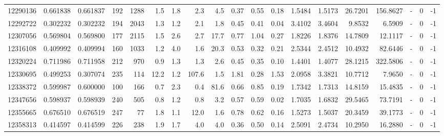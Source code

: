 \begin{tabular}{rrrrrrrrrrrrrrrrlrr}
  12290136 & 0.661838 &   0.661837 &  192 & 1288 &      1.5 &      1.8 &     2.3 &      4.5 &       0.37 &        0.55 &        0.18 &  1.5484 &  1.5173 &   26.7201 &  156.8627 &             - &        0 &         -1 \\
  12292722 & 0.302232 &   0.302232 &  194 & 2043 &      1.3 &      1.2 &     2.1 &      1.8 &       0.45 &        0.41 &        0.04 &  3.4102 &  3.4604 &    9.8532 &    6.5909 &             - &        0 &         -1 \\
  12307056 & 0.569804 &   0.569800 &  177 & 2115 &      1.5 &      2.6 &     2.7 &     17.7 &       0.77 &        1.04 &        0.27 &  1.8226 &  1.8376 &   14.7809 &   12.1117 &             - &        0 &         -1 \\
  12316108 & 0.409992 &   0.409994 &  160 & 1033 &      1.2 &      4.0 &     1.6 &     20.3 &       0.53 &        0.32 &        0.21 &  2.5344 &  2.4512 &   10.4932 &   82.6446 &             - &        0 &         -1 \\
  12320224 & 0.711986 &   0.711958 &  212 &  970 &      0.9 &      1.3 &     1.3 &      2.6 &       0.45 &        0.35 &        0.10 &  1.4401 &  1.4077 &   28.1215 &  322.5806 &             - &        0 &         -1 \\
  12330695 & 0.499253 &   0.307074 &  235 &  114 &     12.2 &      1.2 &   107.6 &      1.5 &       1.81 &        0.28 &        1.53 &  2.0958 &  3.3821 &   10.7712 &    7.9650 &             - &        0 &         -1 \\
  12338372 & 0.599987 &   0.600000 &  100 &  166 &      0.7 &      2.3 &     0.4 &     81.6 &       0.66 &        0.85 &        0.19 &  1.7342 &  1.7313 &   14.8159 &   15.4835 &             - &        0 &         -1 \\
  12347656 & 0.598937 &   0.598939 &  240 &  505 &      0.8 &      1.2 &     0.8 &      3.2 &       0.57 &        0.59 &        0.02 &  1.7035 &  1.6832 &   29.5465 &   73.7191 &             - &        0 &         -1 \\
  12355665 & 0.676510 &   0.676519 &  247 &   77 &      1.8 &      1.1 &    12.0 &      1.6 &       0.78 &        0.62 &        0.16 &  1.5273 &  1.5037 &   20.3459 &   39.1773 &             - &        0 &         -1 \\
  12358313 & 0.414597 &   0.414599 &  226 &  238 &      1.9 &      1.7 &     4.0 &      4.0 &       0.36 &        0.50 &        0.14 &  2.5091 &  2.4734 &   10.2950 &   16.2880 &             - &        0 &         -1 \\

\end{tabular}
